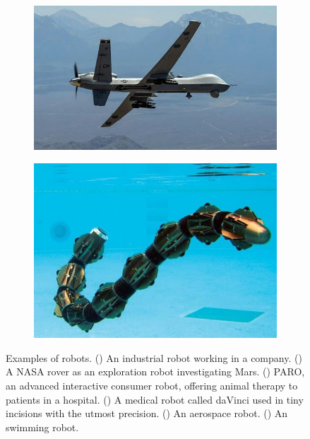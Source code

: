 \documentclass[runningheads,a4paper,12pt]{report}
\begin{document}
\begin{figure}
  \begin{subfigure}{.5\textwidth}
  	\centering
  	\includegraphics[width=\linewidth]{./images/1_aerospace_robot}
  	\caption{}
  	\label{fig:aerospace}
  \end{subfigure} 
  \hfill  
  \begin{subfigure}{.45\textwidth}
  	\centering
  	\includegraphics[width=\linewidth]{./images/1_aquatic_robot}\hfill
  	\caption{}
  	\label{fig:aquatic}
  \end{subfigure}\par\medskip  
  
    \caption{Examples of robots. 
    () An industrial robot working in a company. \cite{industrial-robot}
    () A NASA rover as an exploration robot investigating Mars. \cite{exploration-robot}  
    () PARO, an advanced interactive consumer robot, offering animal therapy to patients in a hospital. \cite{consumer-robot}
    () A medical robot called daVinci used in tiny incisions with the utmost precision. \cite{medical-robot}
    () An aerospace robot. \cite{aerospace-robot}
    () An swimming robot. \cite{aerospace-robot}}
    \label{fig:robot-classification}
\end{figure} 
\end{document}
